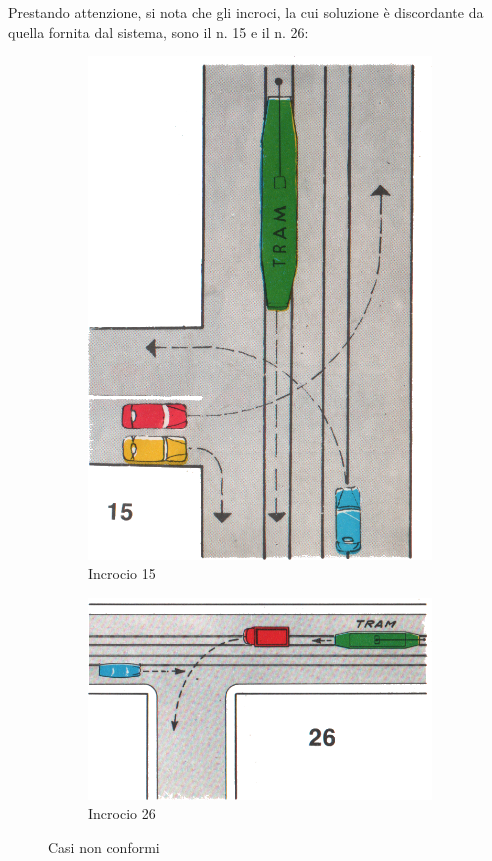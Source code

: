 Prestando attenzione, si nota che gli incroci, la cui soluzione è discordante da quella fornita dal sistema, sono il n. 15 e il n. 26:
\begin{figure}[htbp!]
	\centering
	\begin{subfigure}[b]{.4\textwidth}
		\includegraphics[width=\textwidth]{./images/fig15}
		\caption{Incrocio 15}
		\label{fig:15}
	\end{subfigure}
	\begin{subfigure}[b]{.4\textwidth}
		\includegraphics[width=\textwidth]{./images/fig26}
		\caption{Incrocio 26}
		\label{fig:26}
	\end{subfigure}
	\caption{Casi non conformi}
	\label{fig:disc}
\end{figure}



